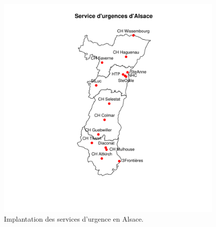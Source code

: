 \documentclass[12pt,english,french,twoside]{book}\usepackage[]{graphicx}\usepackage[]{color}
\makeatletter
\def\maxwidth{ %
  \ifdim\Gin@nat@width>\linewidth
    \linewidth
  \else
    \Gin@nat@width
  \fi
}
\newenvironment{knitrout}{}{} %
\makeatother
\begin{document}
\begin{figure}[ht]
 \centering
\begin{knitrout}
\color{fgcolor}
\includegraphics[width=\maxwidth]{figure/carte_sau_2-1} 

\end{knitrout}
 \caption[Services d'urgence d'Alsace]{Implantation des services d'urgence en Alsace.}
 \label{fig:su_alsace}
\end{figure}
\end{document}
